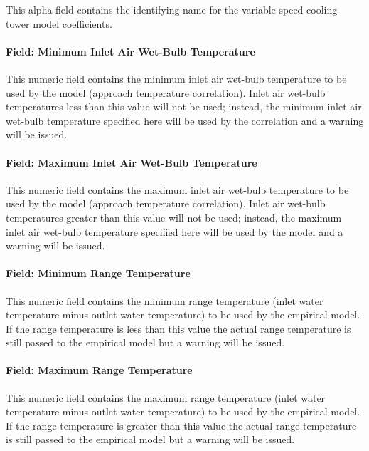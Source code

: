 This alpha field contains the identifying name for the variable speed cooling tower model coefficients.

\paragraph{Field: Minimum Inlet Air Wet-Bulb Temperature}\label{field-minimum-inlet-air-wet-bulb-temperature-1}

This numeric field contains the minimum inlet air wet-bulb temperature to be used by the model (approach temperature correlation). Inlet air wet-bulb temperatures less than this value will not be used; instead, the minimum inlet air wet-bulb temperature specified here will be used by the correlation and a warning will be issued.

\paragraph{Field: Maximum Inlet Air Wet-Bulb Temperature}\label{field-maximum-inlet-air-wet-bulb-temperature-1}

This numeric field contains the maximum inlet air wet-bulb temperature to be used by the model (approach temperature correlation). Inlet air wet-bulb temperatures greater than this value will not be used; instead, the maximum inlet air wet-bulb temperature specified here will be used by the model and a warning will be issued.

\paragraph{Field: Minimum Range Temperature}\label{field-minimum-range-temperature-1}

This numeric field contains the minimum range temperature (inlet water temperature minus outlet water temperature) to be used by the empirical model. If the range temperature is less than this value the actual range temperature is still passed to the empirical model but a warning will be issued.

\paragraph{Field: Maximum Range Temperature}\label{field-maximum-range-temperature-1}

This numeric field contains the maximum range temperature (inlet water temperature minus outlet water temperature) to be used by the empirical model. If the range temperature is greater than this value the actual range temperature is still passed to the empirical model but a warning will be issued.

